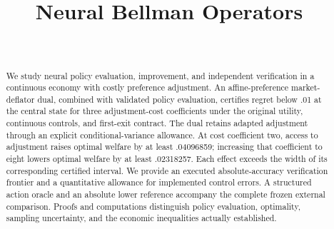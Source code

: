 \documentclass[ecta]{econsocart}
\theoremstyle{remark}
\begin{document}
\begin{frontmatter}
\title{Neural Bellman Operators}
\begin{aug}
\author[id=au1,addressref={add1}]{~}
\address[id=add1]{}
\end{aug}
\begin{abstract}
We study neural policy evaluation, improvement, and independent verification in a continuous economy with costly preference adjustment. An affine-preference market-deflator dual, combined with validated policy evaluation, certifies regret below .01 at the central state for three adjustment-cost coefficients under the original utility, continuous controls, and first-exit contract. The dual retains adapted adjustment through an explicit conditional-variance allowance. At cost coefficient two, access to adjustment raises optimal welfare by at least .04096859; increasing that coefficient to eight lowers optimal welfare by at least .02318257. Each effect exceeds the width of its corresponding certified interval. We provide an executed absolute-accuracy verification frontier and a quantitative allowance for implemented control errors. A structured action oracle and an absolute lower reference accompany the complete frozen external comparison. Proofs and computations distinguish policy evaluation, optimality, sampling uncertainty, and the economic inequalities actually established.
\end{abstract}
\begin{keyword}
\end{keyword}
\end{frontmatter}

\begin{appendix}



\end{appendix}

\end{document}
